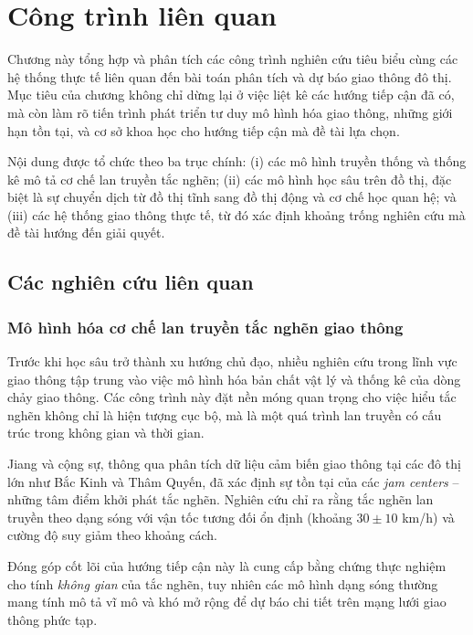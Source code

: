 \section{Công trình liên quan}

Chương này tổng hợp và phân tích các công trình nghiên cứu tiêu biểu cùng các hệ thống thực tế liên quan đến bài toán phân tích và dự báo giao thông đô thị. Mục tiêu của chương không chỉ dừng lại ở việc liệt kê các hướng tiếp cận đã có, mà còn làm rõ tiến trình phát triển tư duy mô hình hóa giao thông, những giới hạn tồn tại, và cơ sở khoa học cho hướng tiếp cận mà đề tài lựa chọn.

Nội dung được tổ chức theo ba trục chính: (i) các mô hình truyền thống và thống kê mô tả cơ chế lan truyền tắc nghẽn; (ii) các mô hình học sâu trên đồ thị, đặc biệt là sự chuyển dịch từ đồ thị tĩnh sang đồ thị động và cơ chế học quan hệ; và (iii) các hệ thống giao thông thực tế, từ đó xác định khoảng trống nghiên cứu mà đề tài hướng đến giải quyết.

\subsection{Các nghiên cứu liên quan}

\subsubsection{Mô hình hóa cơ chế lan truyền tắc nghẽn giao thông}

Trước khi học sâu trở thành xu hướng chủ đạo, nhiều nghiên cứu trong lĩnh vực giao thông tập trung vào việc mô hình hóa bản chất vật lý và thống kê của dòng chảy giao thông. Các công trình này đặt nền móng quan trọng cho việc hiểu tắc nghẽn không chỉ là hiện tượng cục bộ, mà là một quá trình lan truyền có cấu trúc trong không gian và thời gian.


Jiang và cộng sự, thông qua phân tích dữ liệu cảm biến giao thông tại các đô thị lớn như Bắc Kinh và Thâm Quyến, đã xác định sự tồn tại của các \textit{jam centers} – những tâm điểm khởi phát tắc nghẽn. Nghiên cứu chỉ ra rằng tắc nghẽn lan truyền theo dạng sóng với vận tốc tương đối ổn định (khoảng $30 \pm 10$ km/h) và cường độ suy giảm theo khoảng cách.

Đóng góp cốt lõi của hướng tiếp cận này là cung cấp bằng chứng thực nghiệm cho tính \emph{không gian} của tắc nghẽn, tuy nhiên các mô hình dạng sóng thường mang tính mô tả vĩ mô và khó mở rộng để dự báo chi tiết trên mạng lưới giao thông phức tạp.

